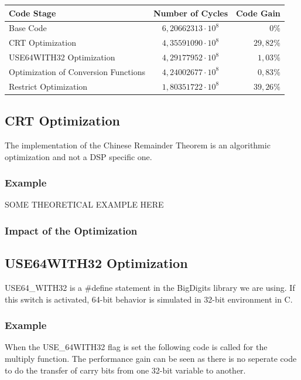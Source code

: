 \documentclass[a4paper]{article}
\begin{document}
\begin{center}
    \begin{tabular}{| l | c | r |}
        \hline
        Code Stage & Number of Cycles & Code Gain \\ \hline
        Base Code & $6,20662313 \cdot 10^{8}$ 	& $0\%$ \\
        CRT Optimization & $4,35591090 \cdot 10^{8}$ & $29,82\%$ \\
        USE64WITH32 Optimization 	& $4,29177952 \cdot 10^{8}$ & $1,03\%$ \\
        Optimization of Conversion Functions & $4,24002677 \cdot 10^{8}$ & $0,83\%$ \\
        Restrict Optimization	 & $1,80351722 \cdot 10^{8}$ & $39,26\%$ \\
        \hline
    \end{tabular}
\end{center}

\subsection{CRT Optimization}
The implementation of the Chinese Remainder Theorem is an algorithmic optimization and not a DSP specific one. 

\subsubsection{Example}
SOME THEORETICAL EXAMPLE HERE

\subsubsection{Impact of the Optimization}

\subsection{USE64WITH32 Optimization}
USE64\_WITH32 is a $\#$define statement in the BigDigits library we are using. If this switch is activated, 64-bit behavior is simulated in 32-bit environment in C.

\subsubsection{Example}
When the USE\_64WITH32 flag is set the following code is called for the multiply function. The performance gain can be seen as there is no seperate code to do the transfer of carry bits from one 32-bit variable to another.
\end{document}
